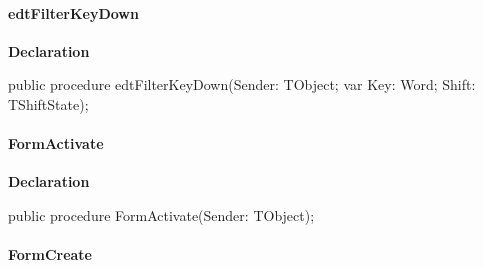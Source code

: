 \documentclass{report}
\newif\ifpdf
\begin{document}
\paragraph*{edtFilterKeyDown}\hspace*{\fill}

\label{manager.TMnFrm-edtFilterKeyDown}
\begin{list}{}{
\setlength{\itemindent}{0cm}
\setlength{\listparindent}{0cm}
\setlength{\leftmargin}{\evensidemargin}
\addtolength{\leftmargin}{\tmplength}
\settowidth{\labelsep}{X}
\addtolength{\leftmargin}{\labelsep}
\setlength{\labelwidth}{\tmplength}
}
\item[\textbf{Declaration}\hfill]
\ifpdf
\begin{flushleft}
\fi
\begin{ttfamily}
public procedure edtFilterKeyDown(Sender: TObject; var Key: Word; Shift: TShiftState);\end{ttfamily}

\ifpdf
\end{flushleft}
\fi

\end{list}
\paragraph*{FormActivate}\hspace*{\fill}

\label{manager.TMnFrm-FormActivate}
\begin{list}{}{
\setlength{\itemindent}{0cm}
\setlength{\listparindent}{0cm}
\setlength{\leftmargin}{\evensidemargin}
\addtolength{\leftmargin}{\tmplength}
\settowidth{\labelsep}{X}
\addtolength{\leftmargin}{\labelsep}
\setlength{\labelwidth}{\tmplength}
}
\item[\textbf{Declaration}\hfill]
\ifpdf
\begin{flushleft}
\fi
\begin{ttfamily}
public procedure FormActivate(Sender: TObject);\end{ttfamily}

\ifpdf
\end{flushleft}
\fi

\end{list}
\paragraph*{FormCreate}\hspace*{\fill}
\end{document}
